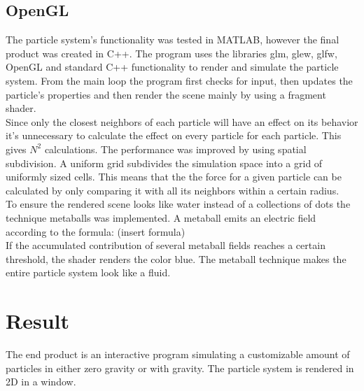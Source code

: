 \documentclass[a4paper,12pt,twoside]{report}
\begin{document}
\section{OpenGL}
The particle system’s functionality was tested in MATLAB, however the final product was created in C++. The program uses the libraries glm, glew, glfw, OpenGL and standard C++ functionality to render and simulate the particle system. From the main loop the program first checks for input, then updates the particle’s properties and then render the scene mainly by using a fragment shader. \\

\noindent Since only the closest neighbors of each particle will have an effect on its behavior it’s unnecessary to calculate the effect on every particle for each particle. This gives \(N^2\) calculations. The performance was improved by using spatial subdivision. A uniform grid subdivides the simulation space into a grid of uniformly sized cells. This means that the the force for a given particle can be calculated by only comparing it with all its neighbors within a certain radius. \\

\noindent To ensure the rendered scene looks like water instead of a collections of dots the technique metaballs was implemented. A metaball emits an electric field according to the formula: (insert formula) \\

\noindent  If the accumulated contribution of several metaball fields reaches a certain threshold, the shader renders the color blue. The metaball technique makes the entire particle system look like a fluid.

\chapter{Result}
The end product is an interactive program simulating a customizable amount of particles in either zero gravity or with gravity. The particle system is rendered in 2D in a window.
\end{document}
